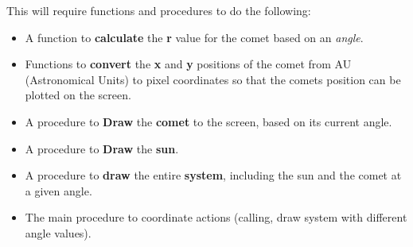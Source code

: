 This will require functions and procedures to do the following:
\begin{itemize}
  \item A function to \textbf{calculate} the \textbf{r} value for the comet based on an \emph{angle}.
  \item Functions to \textbf{convert} the \textbf{x} and \textbf{y} positions of the comet from AU (Astronomical Units) to pixel coordinates so that the comets position can be plotted on the screen.
  \item A procedure to \textbf{Draw} the \textbf{comet} to the screen, based on its current angle.
  \item A procedure to \textbf{Draw} the \textbf{sun}.
  \item A procedure to \textbf{draw} the entire \textbf{system}, including the sun and the comet at a given angle.
  \item The main procedure to coordinate actions (calling, draw system with different angle values).
\end{itemize}

\clearpage


\begin{figure}[p]
\end{figure}

\begin{figure}[p]
\end{figure}

